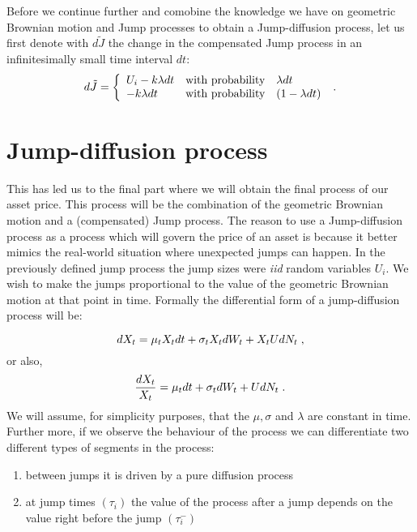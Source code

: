 \documentclass[times, utf8, diplomski]{fer}
\begin{document}
	\noindent Before we continue further and comobine the knowledge we have on geometric Brownian motion and Jump processes to obtain a Jump-diffusion process, let us first denote with $d\tilde{J}$ the change in the compensated Jump process in an infinitesimally small time interval $dt$:
	\begin{equation}
		d\tilde{J} = \left\{  \begin{array}{lcl} U_i - k\lambda dt& \mbox{with probability} & \lambda dt \\
																	- k\lambda dt & \mbox{with probability} & (1 - \lambda dt) \end{array} \right.
	 \hspace{0.1cm}.\end{equation}

	\section{Jump-diffusion process}
	This has led us to the final part where we will obtain the final process of our asset price. This process will be the combination of the geometric Brownian motion and a (compensated) Jump process. The reason to use a Jump-diffusion process as a process which will govern the price of an asset is because it better mimics the real-world situation where unexpected jumps can happen. In the previously defined jump process the jump sizes were \textit{iid} random variables $U_i$. We wish to make the jumps proportional to the value of the geometric Brownian motion at that point in time. Formally the differential form of a jump-diffusion process will be:

	\begin{equation} \label{eqn_jd}
		dX_t = \mu_tX_tdt + \sigma_tX_tdW_t + X_tUdN_t \hspace{0.1cm},
	\end{equation} or also,
	\begin{equation} \label{eqn_jd_frac}
		\frac{dX_t}{X_t} = \mu_tdt + \sigma_tdW_t + UdN_t \hspace{0.1cm}.
	\end{equation} 
	We will assume, for simplicity purposes, that the $\mu, \sigma$ and $\lambda$ are constant in time. Further more, if we observe the behaviour of the process we can differentiate two different types of segments in the process:
	\begin{enumerate}
		\item between jumps it is driven by a pure diffusion process
		\item at jump times $(\tau_i)$ the value of the process after a jump depends on the value right before the jump $(\tau_i^-)$
	\end{enumerate}
\end{document}

